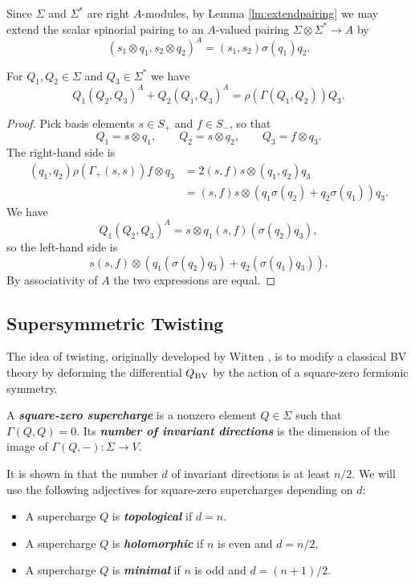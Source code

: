 \documentclass[10pt, oneside]{article}
\newcommand{\defterm}[1]{\textbf{\emph{#1}}}
\begin{document}
Since $\Sigma$ and $\Sigma^*$ are right $A$-modules, by Lemma \ref{lm:extendpairing} we may extend the scalar spinorial pairing to an $A$-valued pairing $\Sigma\otimes \Sigma^*\rightarrow A$ by
\[(s_1\otimes q_1, s_2\otimes q_2)^A = (s_1, s_2)\sigma(q_1) q_2.\]

\begin{thm}
For $Q_1, Q_2\in\Sigma$ and $Q_3\in\Sigma^*$ we have
\[Q_1(Q_2, Q_3)^A + Q_2(Q_1, Q_3)^A = \rho(\Gamma(Q_1, Q_2))Q_3.\]
\label{thm:2dmatter3psi}
\end{thm}
\begin{proof}
Pick basis elements $s\in S_+$ and $f\in S_-$, so that
\[Q_1 = s\otimes q_1,\qquad Q_2 = s\otimes q_2,\qquad Q_3 = f\otimes q_3.\]
The right-hand side is
\begin{align*}
(q_1, q_2) \rho(\Gamma_+(s, s)) f\otimes q_3 &= 2(s, f) s\otimes (q_1, q_2) q_3 \\
&= (s, f) s\otimes (q_1\sigma(q_2) + q_2\sigma(q_1)) q_3.
\end{align*}
We have
\[Q_1(Q_2, Q_3)^A = s\otimes q_1 (s, f) (\sigma(q_2)q_3),\]
so the left-hand side is
\[s(s, f)\otimes (q_1(\sigma(q_2) q_3) + q_2(\sigma(q_1)q_3)).\]
By associativity of $A$ the two expressions are equal.
\end{proof}

\subsection{Supersymmetric Twisting}
The idea of twisting, originally developed by Witten \cite{WittenTQFT}, is to modify a classical BV theory by deforming the differential $Q_{\mathrm{BV}}$ by the action of a square-zero fermionic symmetry. 

\begin{definition}
A \defterm{square-zero supercharge} is a nonzero element $Q\in\Sigma$ such that $\Gamma(Q, Q)=0$. Its \defterm{number of invariant directions} is the dimension of the image of $\Gamma(Q, -)\colon \Sigma\rightarrow V$.
\end{definition}

It is shown in \cite[Proposition 3.25]{ElliottSafronov} that the number $d$ of invariant directions is at least $n/2$. We will use the following adjectives for square-zero supercharges depending on $d$:
\begin{itemize}
\item A supercharge $Q$ is \defterm{topological} if $d = n$.

\item A supercharge $Q$ is \defterm{holomorphic} if $n$ is even and $d=n/2$.

\item A supercharge $Q$ is \defterm{minimal} if $n$ is odd and $d=(n+1)/2$.
\end{itemize}
\end{document}
